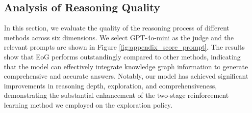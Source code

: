 \subsection{Analysis of Reasoning Quality}
In this section, we evaluate the quality of the reasoning process of different methods across six dimensions.
We select GPT-4o-mini as the judge and the relevant prompts are shown in Figure \ref{fig:appendix_score_prompt}.
The results show that EoG performs outstandingly compared to other methods, indicating that the model can effectively integrate knowledge graph information to generate comprehensive and accurate answers.
Notably, our model has achieved significant improvements in reasoning depth, exploration, and comprehensiveness, demonstrating the substantial enhancement of the two-stage reinforcement learning method we employed on the exploration policy.

